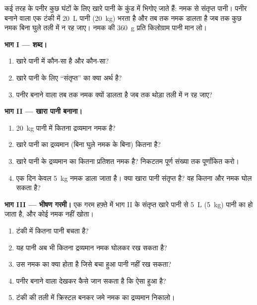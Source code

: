 \begin{problem}
\label{pb:g6:solutions-and-solubility:1}
कई तरह के पनीर कुछ घंटों के लिए खारे पानी के कुंड में भिगोए जाते हैं: नमक
से संतृप्त पानी। पनीर बनाने वाला एक टंकी में \qty{20}{L} पानी
(\qty{20}{kg}) भरता है और तब तक नमक डालता है जब तक कुछ नमक बिना घुले तली
में न रह जाए। नमक की  \qty{360}{g} प्रति किलोग्राम पानी
मान लो।

\medskip
\noindent\textbf{भाग I --- शब्द।}
\begin{enumerate}
  \item खारे पानी में  कौन-सा है और  कौन-सा?
  \item खारे पानी के लिए ``संतृप्त'' का क्या अर्थ है?
  \item पनीर बनाने वाला तब तक नमक क्यों डालता है जब तक थोड़ा तली में
        न रह जाए?
\end{enumerate}

\medskip
\noindent\textbf{भाग II --- खारा पानी बनाना।}
\begin{enumerate}[resume]
  \item \qty{20}{kg} पानी में कितना द्रव्यमान नमक  है?
  \item खारे पानी का द्रव्यमान (बिना घुले नमक के बिना) कितना है?
  \item खारे पानी के द्रव्यमान का कितना प्रतिशत नमक है? निकटतम पूर्ण
        संख्या तक पूर्णांकित करो।
  \item एक दिन केवल \qty{5}{kg} नमक डाला जाता है। क्या खारा पानी
        संतृप्त है? वह कितना और नमक घोल सकता है?
\end{enumerate}

\medskip
\noindent\textbf{भाग III --- भीषण गरमी।}
एक गरम हफ़्ते में भाग II के संतृप्त खारे पानी से \qty{5}{L} (\qty{5}{kg})
पानी का  हो जाता है, और कोई नमक नहीं खोता।
\begin{enumerate}[resume]
  \item टंकी में कितना पानी बचता है?
  \item यह पानी अब भी कितना द्रव्यमान नमक घोलकर रख सकता है?
  \item उस नमक का क्या होता है जिसे बचा हुआ पानी नहीं रख सकता?
  \item पनीर बनाने वाला देखकर कैसे जान सकता है कि ऐसा
        हुआ है?
  \item टंकी की तली में क्रिस्टल बनकर जमे नमक का द्रव्यमान
        निकालो।
\end{enumerate}
\end{problem}
